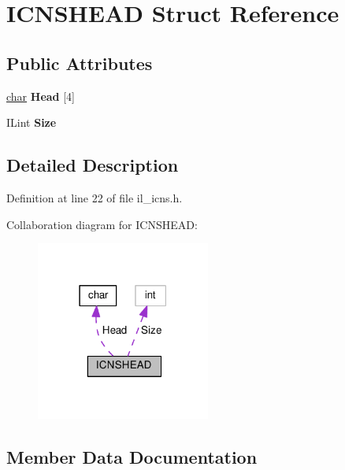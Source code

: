 \hypertarget{structICNSHEAD}{}\section{I\+C\+N\+S\+H\+E\+AD Struct Reference}
\label{structICNSHEAD}
\subsection*{Public Attributes}
\begin{DoxyCompactItemize}
\item 
\mbox{\label{structICNSHEAD_ae36d6e6e7f2ca817f755cd8068ff5c25}} 
\hyperlink{classchar}{char} {\bfseries Head} \mbox{[}4\mbox{]}
\item 
\mbox{\label{structICNSHEAD_aa8cb9a267f563452dd20a84db058d3d2}} 
I\+Lint {\bfseries Size}
\end{DoxyCompactItemize}


\subsection{Detailed Description}


Definition at line 22 of file il\+\_\+icns.\+h.



Collaboration diagram for I\+C\+N\+S\+H\+E\+AD\+:
\nopagebreak
\begin{figure}[H]
\begin{center}
\leavevmode
\includegraphics[width=162pt]{d8/d83/structICNSHEAD__coll__graph}
\end{center}
\end{figure}


\subsection{Member Data Documentation}
\mbox{\label{structICNSHEAD_ae36d6e6e7f2ca817f755cd8068ff5c25}} 
